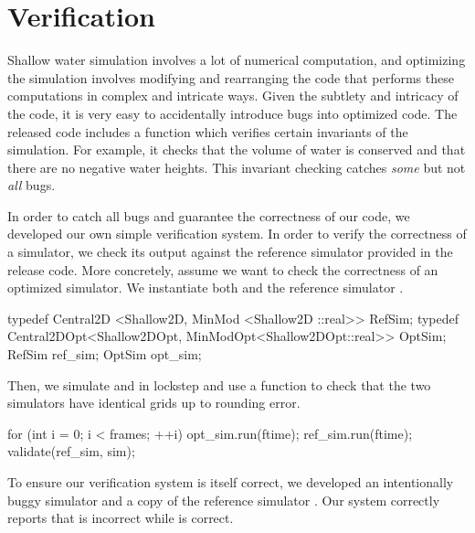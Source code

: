 \section{Verification}\label{sec:verification}
Shallow water simulation involves a lot of numerical computation, and
optimizing the simulation involves modifying and rearranging the code that
performs these computations in complex and intricate ways. Given the subtlety
and intricacy of the code, it is very easy to accidentally introduce bugs into
optimized code. The released code includes a  function
which verifies certain invariants of the simulation. For example, it checks
that the volume of water is conserved and that there are no negative water
heights. This invariant checking catches \emph{some} but not \emph{all} bugs.

In order to catch all bugs and guarantee the correctness of our code, we
developed our own simple verification system. In order to verify the
correctness of a simulator, we check its output against the reference simulator
provided in the release code. More concretely, assume we want to check the
correctness of an optimized  simulator. We instantiate both
 and the reference simulator .

\begin{CPP}
typedef Central2D   <Shallow2D,    MinMod   <Shallow2D   ::real>> RefSim;
typedef Central2DOpt<Shallow2DOpt, MinModOpt<Shallow2DOpt::real>> OptSim;
RefSim ref_sim;
OptSim opt_sim;
\end{CPP}

Then, we simulate  and  in lockstep and use a
function  to check that the two simulators have identical grids
up to rounding error.

\begin{CPP}
for (int i = 0; i < frames; ++i) {
    opt_sim.run(ftime);
    ref_sim.run(ftime);
    validate(ref_sim, sim);
}
\end{CPP}

To ensure our verification system is itself correct, we developed an
intentionally buggy  simulator and a copy of the reference
simulator . Our system correctly reports that  is
incorrect while  is correct.
